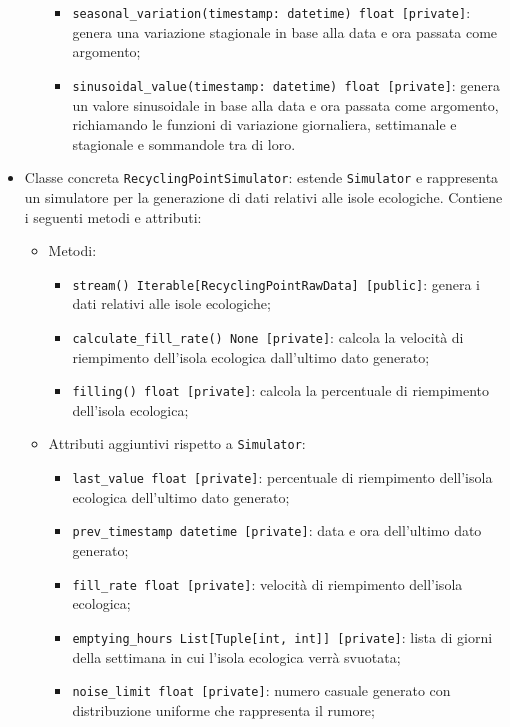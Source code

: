 \begin{itemize}
\begin{itemize}
\begin{itemize}
			            \item \texttt{seasonal\_variation(timestamp: datetime) float [private]}: genera una variazione stagionale in base alla data e ora passata come argomento;
			            \item \texttt{sinusoidal\_value(timestamp: datetime) float [private]}: genera un valore sinusoidale in base alla data e ora passata come argomento, richiamando le funzioni di variazione giornaliera, settimanale e stagionale e sommandole tra di loro.
		            \end{itemize}
	      \end{itemize}
	\item Classe concreta \texttt{RecyclingPointSimulator}: estende \texttt{Simulator} e rappresenta un simulatore per la generazione di dati relativi alle isole ecologiche. Contiene i seguenti metodi e attributi:
	      \begin{itemize}
		      \item Metodi:
		            \begin{itemize}
			            \item \texttt{stream() Iterable[RecyclingPointRawData] [public]}: genera i dati relativi alle isole ecologiche;
			            \item \texttt{calculate\_fill\_rate() None [private]}: calcola la velocità di riempimento dell'isola ecologica dall'ultimo dato generato;
			            \item \texttt{filling() float [private]}: calcola la percentuale di riempimento dell'isola ecologica;
		            \end{itemize}
		      \item Attributi aggiuntivi rispetto a \texttt{Simulator}:
		            \begin{itemize}
			            \item \texttt{last\_value float [private]}: percentuale di riempimento dell'isola ecologica dell'ultimo dato generato;
			            \item \texttt{prev\_timestamp datetime [private]}: data e ora dell'ultimo dato generato;
			            \item \texttt{fill\_rate float [private]}: velocità di riempimento dell'isola ecologica;
			            \item \texttt{emptying\_hours List[Tuple[int, int]] [private]}: lista di giorni della settimana in cui l'isola ecologica verrà svuotata;
			            \item \texttt{noise\_limit float [private]}: numero casuale generato con distribuzione uniforme che rappresenta il rumore;

\end{itemize}
\end{itemize}
\end{itemize}
